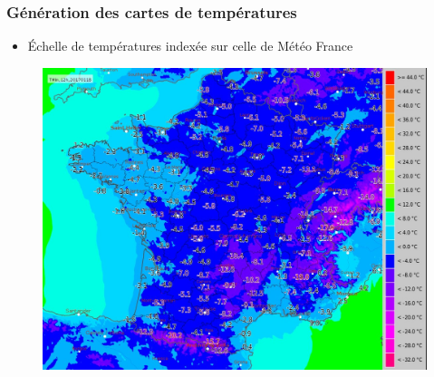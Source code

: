 \documentclass{beamer}
\begin{document}
\begin{frame} \frametitle{Génération des cartes de températures}
  \begin{itemize}
    \item Échelle de températures indexée sur celle de Météo France
  \end{itemize}

  \begin{figure}
    \centering
    \includegraphics[width=\textwidth,height=0.8\textheight,keepaspectratio]{fig/meteo_fr_scales_temp}
  \end{figure}

\end{frame}
\end{document}
